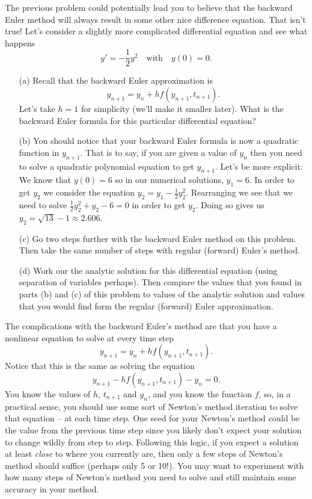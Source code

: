 \begin{problem}
    The previous problem could potentially lead you to believe that the backward Euler
    method will always result in some other nice difference equation.  That isn't true!
    Let's consider a slightly more complicated differential equation and see what happens
    \[ y' = -\frac{1}{2} y^2 \quad \text{with} \quad y(0) = 0. \]
    \begin{enumerate}
        \item[(a)] Recall that the backward Euler approximation is 
            \[ y_{n+1} = y_n + h f(y_{n+1},t_{n+1}). \]
            Let's take $h=1$ for simplicity (we'll make it smaller later).  What is the
            backward Euler formula for this particular differential equation?
        \item[(b)] You should notice that your backward Euler formula is now a quadratic
            function in $y_{n+1}$.  That is to say, if you are given a value of $y_n$ then
            you need to solve a quadratic polynomial equation to get $y_{n+1}$.  Let's be
            more explicit: \\
            We know that $y(0) = 6$ so in our numerical solutions, $y_1 = 6$.  In order to
            get $y_2$ we consider the equation $y_2 = y_1 - \frac{1}{2} y_2^2$.
            Rearranging we see that we need to solve $\frac{1}{2}y_2^2 + y_2 - 6 = 0$
            in order to get $y_2$.  Doing so gives us $y_2 = \sqrt{13} - 1 \approx 2.606$.
        \item[(c)] Go two steps further with the backward Euler method on this problem.
            Then take the same number of steps with regular (forward) Euler's method.
        \item[(d)] Work our the analytic solution for this differential equation (using
            separation of variables perhaps).  Then compare the values that you found in
            parts (b) and (c) of this problem to values of the analytic solution and
            values that you would find form the regular (forward) Euler approximation.
    \end{enumerate}
\end{problem}

The complications with the backward Euler's method are that you have a nonlinear equation
to solve at every time step
\[ y_{n+1} = y_n + h f(y_{n+1},t_{n+1}). \]
Notice that this is the same as solving the equation
\[ y_{n+1} - hf(y_{n+1},t_{n+1}) - y_n = 0. \]
You know the values of $h$, $t_{n+1}$ and $y_n$, and you know the function $f$, so, in a practical sense, you should use some sort of Newton's
method iteration to solve that equation -- at each time step.  One seed for your Newton's method could be the
value from the previous time step since you likely don't expect your solution to change
wildly from step to step.  Following this logic, if you expect a solution at least {\it
close} to where you currently are, then only a few steps of Newton's method should suffice
(perhaps only 5 or 10!).  You may want to experiment with how many steps of Newton's
method you need to solve and still maintain some accuracy in your method.


